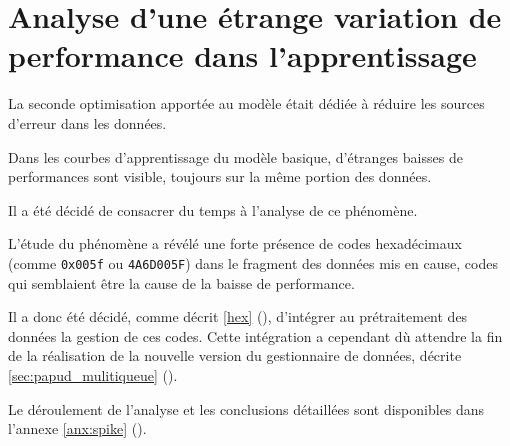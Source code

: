 \section{Analyse d'une étrange variation de performance dans l'apprentissage} \label{sec:spike}
La seconde optimisation apportée au modèle était dédiée à réduire les sources d'erreur dans les données.

Dans les courbes d'apprentissage du modèle basique, d'étranges baisses de performances sont visible, toujours sur la même portion des données.

Il a été décidé de consacrer du temps à l'analyse de ce phénomène.

L'étude du phénomène a révélé une forte présence de codes hexadécimaux (comme \lstinline|0x005f| ou \lstinline|4A6D005F|) dans le fragment des données mis en cause, codes qui semblaient être la cause de la baisse de performance.

Il a donc été décidé, comme décrit \autoref{hex} (), d'intégrer au prétraitement des données la gestion de ces codes.
Cette intégration a cependant dù attendre la fin de la réalisation de la nouvelle version du gestionnaire de données, décrite \autoref{sec:papud_mulitiqueue} ().

Le déroulement de l'analyse et les conclusions détaillées sont disponibles dans l'annexe \ref{anx:spike} ().
